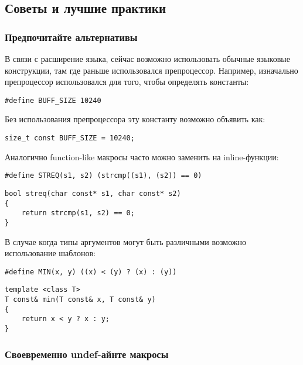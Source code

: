 \subsection{Советы и лучшие практики}
\subsubsection{Предпочитайте альтернативы}

В связи с расширение языка, сейчас возможно использовать обычные языковые конструкции, там где раньше использовался препроцессор. Например, изначально препроцессор использовался для того, чтобы определять константы:

\begin{verbatim}
#define BUFF_SIZE 10240
\end{verbatim}

Без использования препроцессора эту константу возможно объявить как:
\begin{verbatim}
size_t const BUFF_SIZE = 10240;
\end{verbatim}

Аналогично function-like макросы часто можно заменить на inline-функции:
\begin{verbatim}
#define STREQ(s1, s2) (strcmp((s1), (s2)) == 0)
\end{verbatim}
\begin{verbatim}
bool streq(char const* s1, char const* s2)
{
    return strcmp(s1, s2) == 0;
}
\end{verbatim}

В случае когда типы аргументов могут быть различными возможно использование шаблонов:
\begin{verbatim}
#define MIN(x, y) ((x) < (y) ? (x) : (y))
\end{verbatim}
\begin{verbatim}
template <class T>
T const& min(T const& x, T const& y)
{
    return x < y ? x : y;
}
\end{verbatim}

\subsubsection{Своевременно undef-айнте макросы}

